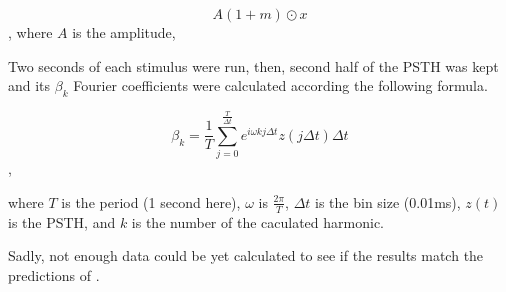 \begin{equation}\label{freqstim} A \left(1+m\right)\odot x\end{equation}, %
where $A$ is the amplitude,

 
Two seconds of each stimulus were run, 
then, second half of the PSTH was kept and its $\beta_k$ Fourier coefficients were calculated according the following formula.

\begin{equation}\label{bkformula} \beta_k = \frac{1}{T} \sum_{j= 0}^{\frac{T}{\Delta t}} e^{i \omega k j \Delta t} z \left( j \Delta t\right)\Delta t\end{equation},

where $T$ is the period (1 second here), %
 $\omega$ is $\frac{2\pi}{T}$,
$\Delta t$ is the bin size (0.01ms),
$z\left(t\right)$ is the PSTH,
and $k$ is the number of the caculated harmonic.

Sadly, not enough data could be yet calculated to see if the results match the predictions of 
\cite{Deger}.










 